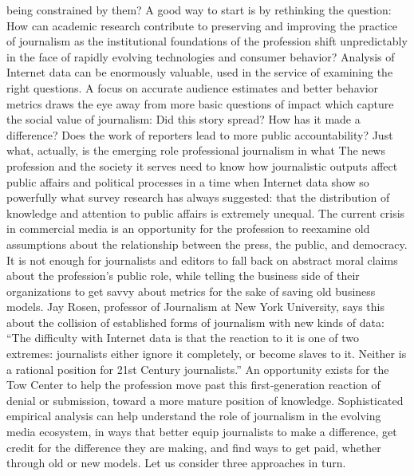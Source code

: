 being constrained by them?
A good way to start is by rethinking the question: How can academic
research contribute to preserving and improving the practice of
journalism as the institutional foundations of the profession shift
unpredictably in the face of rapidly evolving technologies and consumer
behavior? Analysis of Internet data can be enormously valuable, used in
the service of examining the right questions.
A focus on accurate audience estimates and better behavior metrics draws
the eye away from more basic questions of impact which capture the
social value of journalism: Did this story spread? How has it made a
difference? Does the work of reporters lead to more public accountability?
Just what, actually, is the emerging role professional journalism in what
The news profession and the society it serves need to know how
journalistic outputs affect public affairs and political processes in a time
when Internet data show so powerfully what survey research has always
suggested: that the distribution of knowledge and attention to public
affairs is extremely unequal. The current crisis in commercial media is an
opportunity for the profession to reexamine old assumptions about the
relationship between the press, the public, and democracy. It is not
enough for journalists and editors to fall back on abstract moral claims
about the profession’s public role, while telling the business side of their
organizations to get savvy about metrics for the sake of saving old
business models.
Jay Rosen, professor of Journalism at New York University, says this
about the collision of established forms of journalism with new kinds of
data: ``The difficulty with Internet data is that the reaction to it is one of
two extremes: journalists either ignore it completely, or become slaves to
it. Neither is a rational position for 21st Century journalists.''
An opportunity exists for the Tow Center to help the profession move past
this first‐generation reaction of denial or submission, toward a more
mature position of knowledge. Sophisticated empirical analysis can help
understand the role of journalism in the evolving media ecosystem, in
ways that better equip journalists to make a difference, get credit for the
difference they are making, and find ways to get paid, whether through
old or new models. Let us consider three approaches in turn.

